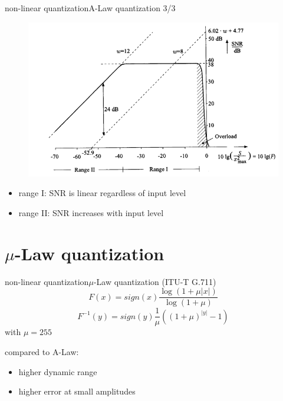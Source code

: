 	\begin{frame}{non-linear quantization}{A-Law quantization 3/3}
	    \vspace{-5mm}
        \begin{figure}
			\centering
				\includegraphics[scale=0.5]{Graph/snr_a-law}
		\end{figure}
        \begin{itemize}
            \item   range I: SNR is linear regardless of input level
            \item   range II: SNR increases with input level
        \end{itemize}
	\end{frame}

\section[$\mu$-law]{$\mu$-Law quantization}
	\begin{frame}{non-linear quantization}{$\mu$-Law quantization  (ITU-T G.711)}
		\begin{equation*}
			F(x)	= sign(x)\frac{\log(1+\mu|x|)}{\log(1+\mu)}
		\end{equation*}
        \bigskip
		\begin{equation*}
			F^{-1}(y)	= sign(y)\frac{1}{\mu}\left((1+\mu)^{|y|}-1\right)
		\end{equation*}
		\bigskip
		\bigskip
        with $\mu = 255$
        
        \pause
        compared to A-Law:
        \begin{itemize}
            \item   higher dynamic range
            \item   higher error at small amplitudes
        \end{itemize}
	\end{frame}	

